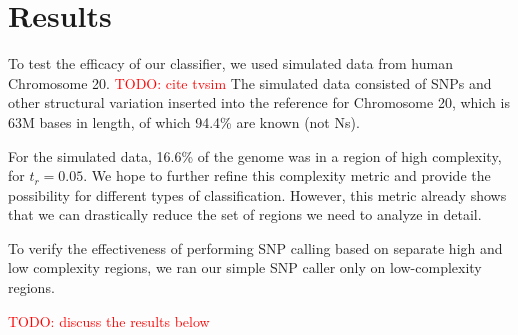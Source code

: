 \documentclass[12pt]{article}
\newcommand\TODO[1]{\textcolor{red}{TODO: #1}}
\begin{document}
\section{Results}

To test the efficacy of our classifier, we used
simulated data from human Chromosome 20. \TODO{cite tvsim} The simulated data consisted of SNPs and other structural variation 
inserted into the reference for Chromosome 20, which is $63$M bases in length,
of which 94.4\% are known (not Ns).

For the simulated data, 16.6\% of the genome was in a region of high complexity, for $t_r =0.05$. 
We hope to further refine this complexity metric and provide the possibility for different types
of classification.  However, this metric already shows that we can drastically
reduce the set of regions we need to analyze in detail.

To verify the
effectiveness of performing SNP calling based on separate high and low
complexity regions, we ran our simple SNP caller only on low-complexity regions.

\TODO{discuss the results below}
\end{document}
